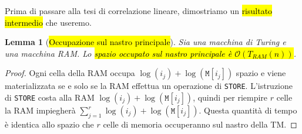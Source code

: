 \documentclass[a4paper,11pt,twoside]{article}
\theoremstyle{plain}
\newtheorem{lem}{Lemma}[section]
\theoremstyle{definition}
\theoremstyle{remark}
\begin{document}
Prima di passare alla tesi di correlazione lineare, dimostriamo un \hl{risultato
intermedio} che useremo.

\begin{lem}[\hl{Occupazione sul nastro principale}]\label{thm:occupazione-nastro}
  Sia una macchina di Turing e una macchina RAM\@. Lo \hl{spazio occupato sul
  nastro principale è $\mathcal{O}(T_{RAM}(n))$}.
\end{lem}
\begin{proof}
  Ogni cella della RAM occupa $\log(i_j)+\log(\mathtt{M}[i_j])$ spazio e viene
  materializzata se e solo se la RAM effettua un operazione di \texttt{STORE}.
  L'istruzione di \texttt{STORE} costa alla RAM $\log(i_j) +
  \log(\mathtt{M}[i_j])$, quindi per riempire $r$ celle la RAM impiegherà
  $\sum_{j=1}^r \log(i_j) + \log(\mathtt{M}[i_j])$. Questa quantità di tempo è
  identica allo spazio che $r$ celle di memoria occuperanno sul nastro della
  TM\@.
\end{proof}
\end{document}
